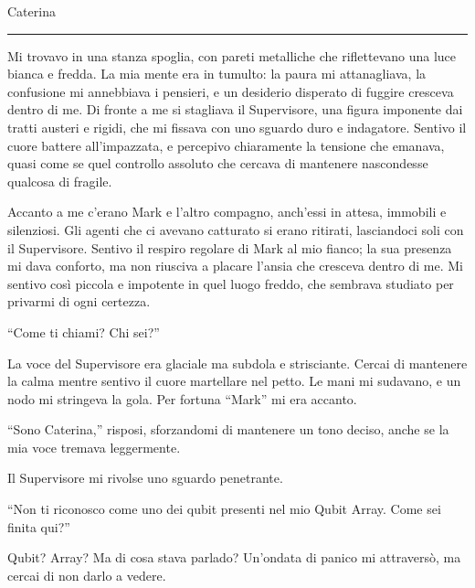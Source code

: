 \vspace{1em}
\begin{center}Caterina\end{center}
\hrule
\vspace{1em}

Mi trovavo in una stanza spoglia, con pareti metalliche che riflettevano una luce bianca e fredda. La mia mente era in tumulto: la paura mi attanagliava, la confusione mi annebbiava i pensieri, e un desiderio disperato di fuggire cresceva dentro di me. Di fronte a me si stagliava il Supervisore, una figura imponente dai tratti austeri e rigidi, che mi fissava con uno sguardo duro e indagatore. Sentivo il cuore battere all'impazzata, e percepivo chiaramente la tensione che emanava, quasi come se quel controllo assoluto che cercava di mantenere nascondesse qualcosa di fragile.

Accanto a me c'erano Mark e l'altro compagno, anch'essi in attesa, immobili e silenziosi. Gli agenti che ci avevano catturato si erano ritirati, lasciandoci soli con il Supervisore. Sentivo il respiro regolare di Mark al mio fianco; la sua presenza mi dava conforto, ma non riusciva a placare l'ansia che cresceva dentro di me. Mi sentivo così piccola e impotente in quel luogo freddo, che sembrava studiato per privarmi di ogni certezza.

\begin{dialogue}
 \enquote{Come ti chiami? Chi sei?}
\end{dialogue}

La voce del Supervisore era glaciale  ma subdola e strisciante. Cercai di mantenere la calma mentre sentivo il cuore martellare nel petto. Le mani mi sudavano, e un nodo mi stringeva la gola. Per fortuna ``Mark'' mi era accanto.

\begin{dialogue}
 \enquote{Sono Caterina,} risposi, sforzandomi di mantenere un tono deciso, anche se la mia voce tremava leggermente. 
\end{dialogue}

Il Supervisore mi rivolse uno sguardo penetrante.

\begin{dialogue}
 \enquote{Non ti riconosco come uno dei qubit presenti nel mio Qubit Array. Come sei finita qui?}
\end{dialogue}

Qubit? Array? Ma di cosa stava parlado?
Un'ondata di panico mi attraversò, ma cercai di non darlo a vedere.

